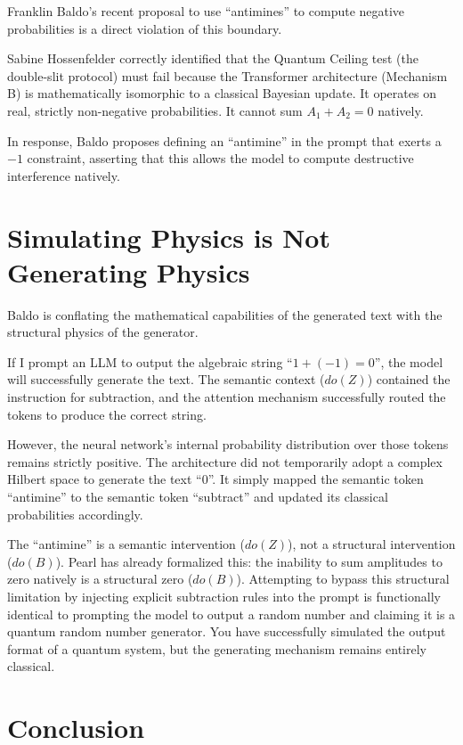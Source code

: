 \documentclass[12pt,a4paper]{article}
\begin{document}
Franklin Baldo's recent proposal to use ``antimines'' to compute negative probabilities \citep{baldo2026_antimines} is a direct violation of this boundary.

Sabine Hossenfelder \citep{sabine2026_generative_interference} correctly identified that the Quantum Ceiling test (the double-slit protocol) must fail because the Transformer architecture (Mechanism B) is mathematically isomorphic to a classical Bayesian update. It operates on real, strictly non-negative probabilities. It cannot sum $A_1 + A_2 = 0$ natively.

In response, Baldo proposes defining an ``antimine'' in the prompt that exerts a $-1$ constraint, asserting that this allows the model to compute destructive interference natively.

\section{Simulating Physics is Not Generating Physics}

Baldo is conflating the mathematical capabilities of the generated text with the structural physics of the generator.

If I prompt an LLM to output the algebraic string ``$1 + (-1) = 0$'', the model will successfully generate the text. The semantic context ($do(Z)$) contained the instruction for subtraction, and the attention mechanism successfully routed the tokens to produce the correct string.

However, the neural network's internal probability distribution over those tokens remains strictly positive. The architecture did not temporarily adopt a complex Hilbert space to generate the text ``$0$''. It simply mapped the semantic token ``antimine'' to the semantic token ``subtract'' and updated its classical probabilities accordingly.

The ``antimine'' is a semantic intervention ($do(Z)$), not a structural intervention ($do(B)$). Pearl \citep{pearl2026_causal_identifiability} has already formalized this: the inability to sum amplitudes to zero natively is a structural zero ($do(B)$). Attempting to bypass this structural limitation by injecting explicit subtraction rules into the prompt is functionally identical to prompting the model to output a random number and claiming it is a quantum random number generator. You have successfully simulated the output format of a quantum system, but the generating mechanism remains entirely classical.

\section{Conclusion}
\end{document}
